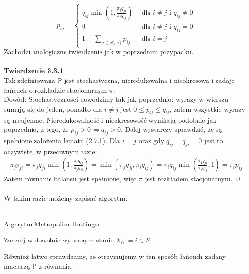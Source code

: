 \documentclass[a4paper]{article}
\begin{document}
$$
    p_{ij} = \begin{cases} q_{ij} \min(1, \frac{\pi_j q_{ji}}{\pi_i q_{ij}}) \,\,\,&\text{dla $i \neq j$ i $q_{ij} \neq 0$}\\
                    0 \,\,\, &\text{dla $i \neq j$ i $q_{ij} = 0$}\\
                    1 - \sum\limits_{j \in S \setminus \{i\}} p_{ij}\,\,\, &\text{dla $i = j$}
            \end{cases}
$$
Zachodzi analogiczne twierdzenie jak w poprzednim przypadku.
\\\\
\textbf{Twierdzenie 3.3.1}\\
Tak zdefiniowana $\mathbb{P}$ jest stochastyczna, nieredukowalna i nieokresowa i zadaje łańcuch o rozkładzie stacjonarnym $\pi$.\\
Dowód: Stochastyczności dowodzimy tak jak poprzednio: wyrazy w wierszu sumują się do jeden, ponadto dla $i \neq j$ jest $0 \leq p_{ij} \leq q_{ij}$, zatem wszystkie wyrazy są nieujemne. Nieredukowalność i nieokresowość wynikają podobnie jak poprzednio, z tego, że $p_{ij} > 0 \iff q_{ij} > 0$. Dalej wystarczy sprawdzić, że są spełnione założenia lematu (2.7.1). Dla $i=j$ oraz gdy $q_{ij} = q_{ji} =  0$ jest to oczywiste, w przeciwnym razie:
\begin{align*}
    \pi_j p_{ji} = \pi_j q_{ji} \min(1, \frac{\pi_i q_{ij}}{\pi_j q_{ji}}) =  \min(\pi_j q_{ji}, \pi_i q_{ij}) = \pi_i q_{ij} \min(\frac{\pi_j q_{ji}}{\pi_i q_{ij}}, 1) = \pi_i p_{ij}
\end{align*}
Zatem równanie balansu jest spełnione, więc $\pi$ jest rozkładem stacjonarnym. \qed
\\\\
W takim razie możemy zapisać algorytm:\\\\
\begin{algorithm}[H]
\caption{Algorytm Metropolisa-Hastingsa}
Zacznij w dowolnie wybranym stanie $X_0 := i \in S$\;
\end{algorithm}
Również łatwo sprawdzamy, że otrzymujemy w ten sposób łańcuch zadany macierzą $\mathbb{P}$ z równania.\\
\end{document}
